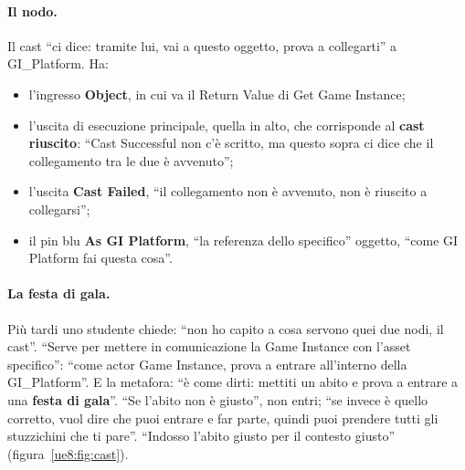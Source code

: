 \paragraph{Il nodo.} Il cast ``ci dice: tramite lui, vai a questo oggetto, prova a
collegarti'' a GI\_Platform. Ha:
\begin{itemize}
  \item l'ingresso \textbf{Object}, in cui va il Return Value di Get Game Instance;
  \item l'uscita di esecuzione principale, quella in alto, che corrisponde al
        \textbf{cast riuscito}: ``Cast Successful non c'è scritto, ma questo sopra ci
        dice che il collegamento tra le due è avvenuto'';
  \item l'uscita \textbf{Cast Failed}, ``il collegamento non è avvenuto, non è riuscito
        a collegarsi'';
  \item il pin blu \textbf{As GI Platform}, ``la referenza dello specifico'' oggetto,
        ``come GI Platform fai questa cosa''.
\end{itemize}

\paragraph{La festa di gala.} Più tardi uno studente chiede: ``non ho capito a cosa
servono quei due nodi, il cast''. ``Serve per mettere in comunicazione la Game Instance
con l'asset specifico'': ``come actor Game Instance, prova a entrare all'interno della
GI\_Platform''. E la metafora: ``è come dirti: mettiti un abito e prova a entrare a una
\textbf{festa di gala}''. ``Se l'abito non è giusto'', non entri; ``se invece è quello
corretto, vuol dire che puoi entrare e far parte, quindi puoi prendere tutti gli
stuzzichini che ti pare''. ``Indosso l'abito giusto per il contesto giusto''
(figura~\ref{ue8:fig:cast}).

